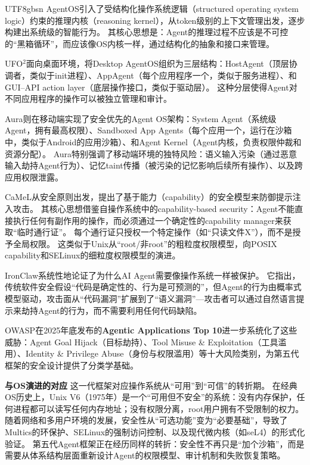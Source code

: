 \documentclass[11pt,a4paper]{article}
\begin{document}
\begin{CJK*}{UTF8}{gbsn}
AgentOS\cite{agentos2025}引入了受结构化操作系统逻辑（structured operating system logic）约束的推理内核（reasoning kernel），从token级别的上下文管理出发，逐步构建出系统级的智能行为。
其核心思想是：Agent的推理过程不应该是不可控的``黑箱循环''，而应该像OS内核一样，通过结构化的抽象和接口来管理。

UFO$^2$\cite{ufo2_2025}面向桌面环境，将Desktop AgentOS组织为三层结构：HostAgent（顶层协调者，类似于init进程）、AppAgent（每个应用程序一个，类似于服务进程）、和GUI--API action layer（底层操作接口，类似于驱动层）。
这种分层使得Agent对不同应用程序的操作可以被独立管理和审计。

Aura\cite{aura2025}则在移动端实现了安全优先的Agent OS架构：System Agent（系统级Agent，拥有最高权限）、Sandboxed App Agents（每个应用一个，运行在沙箱中，类似于Android的应用沙箱）、和Agent Kernel（Agent内核，负责权限仲裁和资源分配）。
Aura特别强调了移动端环境的独特风险：语义输入污染（通过恶意输入劫持Agent行为）、记忆taint传播（被污染的记忆影响后续所有操作）、以及跨应用权限泄露。

CaMeL\cite{debenedetti2025camel}从安全原则出发，提出了基于能力（capability）的安全模型来防御提示注入攻击。
其核心思想借鉴自操作系统中的capability-based security：Agent不能直接执行任何有副作用的操作，而必须通过一个确定性的capability manager来获取``临时通行证''。
每个通行证只授权一个特定操作（如``只读文件X''），而不是授予全局权限。
这类似于Unix从``root/非root''的粗粒度权限模型，向POSIX capability和SELinux的细粒度权限模型的演进。

IronClaw\cite{ironclaw2025}系统性地论证了为什么AI Agent需要像操作系统一样被保护。
它指出，传统软件安全假设``代码是确定性的、行为是可预测的''，但Agent的行为由概率式模型驱动，攻击面从``代码漏洞''扩展到了``语义漏洞''---攻击者可以通过自然语言提示来劫持Agent的行为，而不需要利用任何代码缺陷。

OWASP在2025年底发布的\textbf{Agentic Applications Top 10}\cite{owasp_agentic2026}进一步系统化了这些威胁：Agent Goal Hijack（目标劫持）、Tool Misuse \& Exploitation（工具滥用）、Identity \& Privilege Abuse（身份与权限滥用）等十大风险类别，为第五代框架的安全设计提供了分类学基础。

\textbf{与OS演进的对应}
这一代框架对应操作系统从``可用''到``可信''的转折期。
在经典OS历史上，Unix V6（1975年）是一个``可用但不安全''的系统：没有内存保护，任何进程都可以读写任何内存地址；没有权限分离，root用户拥有不受限制的权力。
随着网络和多用户环境的发展，安全性从``可选功能''变为``必要基础''，导致了Multics的环保护、SELinux的强制访问控制、以及现代微内核（如seL4）的形式化验证\cite{ostep_2023}。
第五代Agent框架正在经历同样的转折：安全性不再只是``加个沙箱''，而是需要从体系结构层面重新设计Agent的权限模型、审计机制和失败恢复策略。


\end{CJK*}
\end{document}
